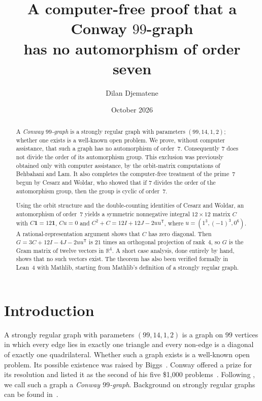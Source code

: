 \documentclass[11pt,a4paper]{amsart}
\title[No automorphism of order seven in a Conway 99-graph]{A computer-free proof that a Conway $99$-graph\\ has no automorphism of order seven}
\author{Dilan Djematene}
\date{October 2026}
\theoremstyle{definition}
\theoremstyle{remark}
\newcommand{\R}{\mathbb{R}}
\newcommand{\one}{\mathbf{1}}
\newcommand{\T}{\mathsf{T}}
\begin{document}
\begin{abstract}
A \emph{Conway $99$-graph} is a strongly regular graph with parameters $(99,14,1,2)$; whether one exists
is a well-known open problem. We prove, without computer assistance, that such a graph has no automorphism
of order~$7$. Consequently $7$ does not divide the order of its automorphism group. This exclusion was
previously obtained only with computer assistance, by the orbit-matrix computations of Behbahani and Lam. It also completes
the computer-free treatment of the prime~$7$ begun by Cesarz and Woldar, who showed that if $7$ divides
the order of the automorphism group, then the group is cyclic of order~$7$.

Using the orbit structure and the double-counting identities of Cesarz and Woldar, an automorphism of
order~$7$ yields a symmetric nonnegative integral $12\times12$ matrix $C$ with $C\one=12\one$, $Cu=0$ and
$C^2+C=12I+12J-2uu^{\T}$, where $u=(1^3,(-1)^3,0^6)$. A rational-representation argument shows that $C$
has zero diagonal. Then $G=3C+12I-4J-2uu^{\T}$ is $21$ times an orthogonal projection of rank~$4$, so $G$
is the Gram matrix of twelve vectors in $\R^4$. A short case analysis, done entirely by hand, shows that no
such vectors exist. The theorem has also been verified formally in Lean~4 with Mathlib, starting from
Mathlib's definition of a strongly regular graph.
\end{abstract}

\maketitle

\section{Introduction}\label{sec:intro}

A strongly regular graph with parameters $(99,14,1,2)$ is a graph on $99$ vertices in which every edge lies
in exactly one triangle and every non-edge is a diagonal of exactly one quadrilateral. Whether such a graph
exists is a well-known open problem. Its possible existence was raised by Biggs~\cite{Bi71}. Conway offered
a prize for its resolution and listed it as the second of his five \$1{,}000 problems~\cite{Co}. Following
\cite{CW25}, we call such a graph a \emph{Conway $99$-graph}. Background on strongly regular graphs can
be found in~\cite{BvM22}.
\end{document}
